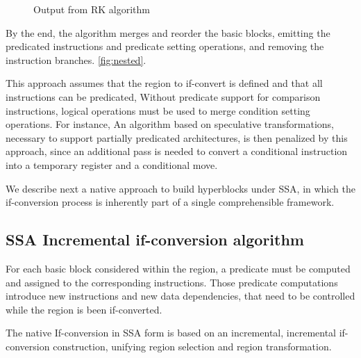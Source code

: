 \begin{figure}
\footnotesize
\caption{Output from RK algorithm}
\label{fig:RK}
\end{figure}

By the end, the algorithm merges and reorder the basic blocks, emitting the predicated instructions and predicate setting operations, and removing the instruction branches. \ref{fig:nested}. 

This approach assumes that the region to if-convert is defined and that all instructions can be predicated, Without predicate support for comparison instructions, logical operations must be used to merge condition setting operations. For instance, An algorithm based on speculative transformations, necessary to support partially predicated architectures, is then penalized by this approach, since an additional pass is needed to convert a conditional instruction into a temporary register and a conditional move.

We describe next a native approach to build hyperblocks under SSA, in which the if-conversion process is inherently part of a single comprehensible framework.

\subsection{SSA Incremental if-conversion algorithm}

For each basic block considered within the region, a predicate must be computed and assigned to the corresponding instructions. Those predicate computations introduce new instructions and new data dependencies, that need to be controlled while the region is been if-converted.

The native If-conversion in SSA form is based on an incremental, incremental if-conversion construction, unifying region selection and region transformation. 

